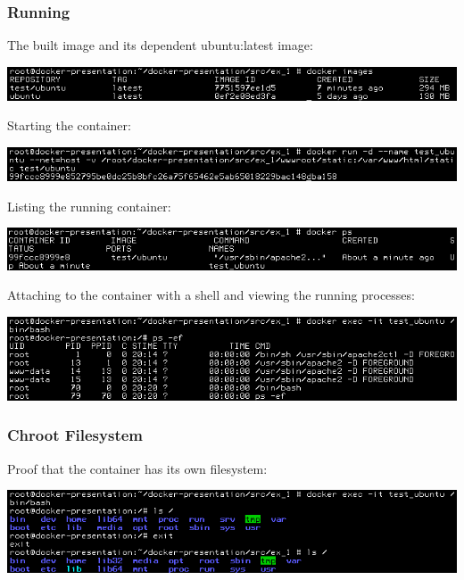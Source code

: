 \documentclass[helvetica,english,utf8,notitle,nologo]{beamer}
\begin{document}
\begin{frame}
  \frametitle{Running}

  The built image and its dependent ubuntu:latest image:

  \includegraphics[scale=0.44]{image_7}

  Starting the container:

  \includegraphics[scale=0.44]{image_8}

  Listing the running container:

  \includegraphics[scale=0.44]{image_9}

  Attaching to the container with a shell and viewing the running
  processes:

  \includegraphics[scale=0.44]{image_10}
\end{frame}

\begin{frame}
  \frametitle{Chroot Filesystem}

  Proof that the container has its own filesystem:

  \includegraphics[scale=0.44]{image_11}
\end{frame}
\end{document}
